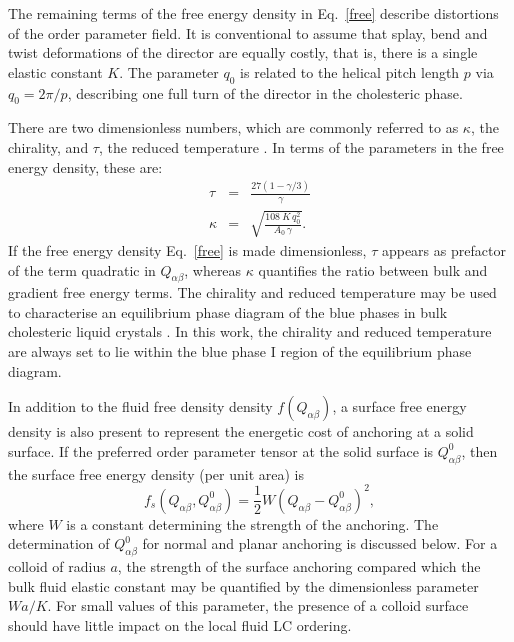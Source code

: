 \documentclass[12pt,twoside]{article}
\begin{document}
The remaining terms of the free energy density in Eq.~\ref{free} describe
distortions of
the order parameter field. It is conventional \cite{blue1,deGennes} to
assume that splay, bend and twist deformations of the director are equally
costly, that is, there is a single elastic constant $K$. The parameter $q_0$
is related to the helical pitch length $p$ via $q_0=2\pi/p$,
describing one full turn of the director in the cholesteric phase.

There are two dimensionless numbers, which are commonly referred to as
$\kappa$, the chirality, and  $\tau$, the reduced temperature
\cite{blue1}.  In terms of the parameters in the free energy density,
these are:
\begin{eqnarray}\label{cntrl-param} 
\tau&=&\frac{27(1-\gamma/3)}{\gamma}\label{tau}\\
\kappa&=&\sqrt{\frac{108\ K\, q_0^2}{A_0\, \gamma}}\label{kappa}.
\end{eqnarray}
If the free energy density Eq.~\ref{free} is made dimensionless, $\tau$
appears as prefactor of the term  quadratic in $Q_{\alpha\beta}$,
whereas $\kappa$
quantifies the ratio between bulk and  gradient free energy terms. The
chirality and reduced temperature may be used to characterise an equilibrium
phase diagram of the blue phases in bulk cholesteric liquid crystals
\cite{blue1,oliver1}.
In this work, the chirality and reduced temperature are always set to lie
within the blue phase I region of the equilibrium phase diagram.

In addition to the fluid free density density $f(Q_{\alpha\beta})$, a surface
free energy density is also present to represent the energetic cost of
anchoring at a solid surface. If the preferred order parameter tensor
at the solid surface is $Q^0_{\alpha\beta}$, then the surface free energy
density (per unit area) is
\begin{equation}
f_s(Q_{\alpha\beta}, Q^0_{\alpha\beta})
= {\textstyle \frac{1}{2}}W(Q_{\alpha\beta} - Q^0_{\alpha\beta})^2,
\end{equation}
where $W$ is a constant determining the strength of the anchoring.
The determination of $Q^0_{\alpha\beta}$ for normal and planar anchoring is
discussed below. For a colloid of radius $a$, the strength of the surface
anchoring compared which the bulk fluid elastic constant may be quantified
by the dimensionless parameter $Wa/K$. For small values of this parameter,
the presence of a colloid surface should have little impact on the local
fluid LC ordering.

\end{document}
